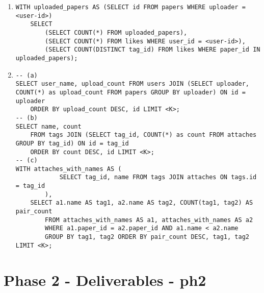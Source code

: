\documentclass{article}
\begin{document}
\begin{enumerate}
\begin{enumerate}
        \item \begin{verbatim}
WITH uploaded_papers AS (SELECT id FROM papers WHERE uploader = <user-id>)
    SELECT
        (SELECT COUNT(*) FROM uploaded_papers),
        (SELECT COUNT(*) FROM likes WHERE user_id = <user-id>),
        (SELECT COUNT(DISTINCT tag_id) FROM likes WHERE paper_id IN uploaded_papers);
\end{verbatim}
  
        \item \begin{verbatim}
-- (a)
SELECT user_name, upload_count FROM users JOIN (SELECT uploader, COUNT(*) as upload_count FROM papers GROUP BY uploader) ON id = uploader
    ORDER BY upload_count DESC, id LIMIT <K>;
-- (b)
SELECT name, count
    FROM tags JOIN (SELECT tag_id, COUNT(*) as count FROM attaches GROUP BY tag_id) ON id = tag_id
    ORDER BY count DESC, id LIMIT <K>;
-- (c)
WITH attaches_with_names AS (
            SELECT tag_id, name FROM tags JOIN attaches ON tags.id = tag_id
        ),
    SELECT a1.name AS tag1, a2.name AS tag2, COUNT(tag1, tag2) AS pair_count
        FROM attaches_with_names AS a1, attaches_with_names AS a2
        WHERE a1.paper_id = a2.paper_id AND a1.name < a2.name
        GROUP BY tag1, tag2 ORDER BY pair_count DESC, tag1, tag2 LIMIT <K>;
\end{verbatim}
    \end{enumerate}
\end{enumerate}

\newpage

\section*{Phase 2 - Deliverables - ph2}
\end{document}
